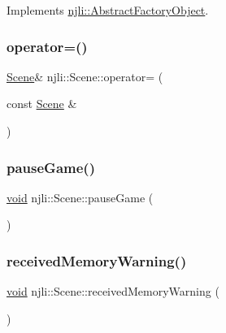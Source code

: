 Implements \mbox{\hyperlink{classnjli_1_1_abstract_factory_object_a838f4fa7e65cace6098aab5222892942}{njli\+::\+Abstract\+Factory\+Object}}.

\mbox{\label{classnjli_1_1_scene_a6d9e503fc33bad3dc24f884a72e17d08}} 
\subsubsection{\texorpdfstring{operator=()}{operator=()}}
{\footnotesize\ttfamily \mbox{\hyperlink{classnjli_1_1_scene}{Scene}}\& njli\+::\+Scene\+::operator= (\begin{DoxyParamCaption}\item[{const \mbox{\hyperlink{classnjli_1_1_scene}{Scene}} \&}]{ }\end{DoxyParamCaption})\hspace{0.3cm}{\ttfamily [protected]}}

\mbox{\label{classnjli_1_1_scene_a0cfb41baa6a570e3e298ff7b455da617}} 
\subsubsection{\texorpdfstring{pause\+Game()}{pauseGame()}}
{\footnotesize\ttfamily \mbox{\hyperlink{_thread_8h_af1e856da2e658414cb2456cb6f7ebc66}{void}} njli\+::\+Scene\+::pause\+Game (\begin{DoxyParamCaption}{ }\end{DoxyParamCaption})}

\mbox{\label{classnjli_1_1_scene_ad68f6a92d484bc021051b8d12b4eaf38}} 
\subsubsection{\texorpdfstring{received\+Memory\+Warning()}{receivedMemoryWarning()}}
{\footnotesize\ttfamily \mbox{\hyperlink{_thread_8h_af1e856da2e658414cb2456cb6f7ebc66}{void}} njli\+::\+Scene\+::received\+Memory\+Warning (\begin{DoxyParamCaption}{ }\end{DoxyParamCaption})}

